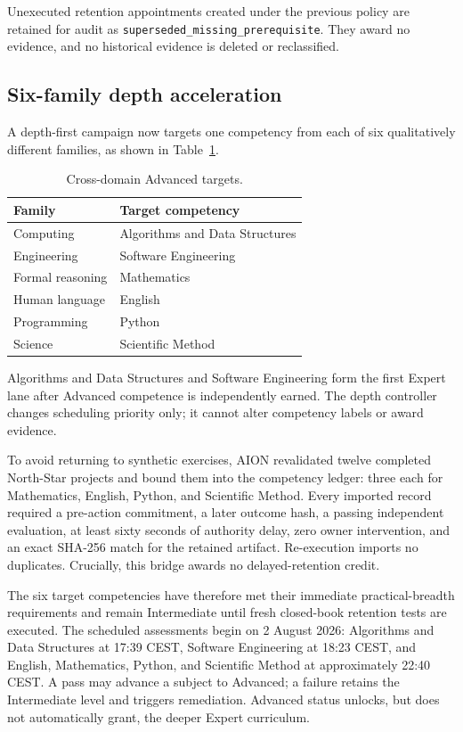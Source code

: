 Unexecuted retention appointments created under the previous policy are retained
for audit as \texttt{superseded\_missing\_prerequisite}.  They award no evidence,
and no historical evidence is deleted or reclassified.

\subsection{Six-family depth acceleration}

A depth-first campaign now targets one competency from each of six qualitatively
different families, as shown in Table~\ref{tab:aion-depth-targets}.

\begin{table}[htbp]
\centering
\caption{Cross-domain Advanced targets.}
\label{tab:aion-depth-targets}
\begin{tabular}{ll}
\hline
\textbf{Family} & \textbf{Target competency} \\
\hline
Computing & Algorithms and Data Structures \\
Engineering & Software Engineering \\
Formal reasoning & Mathematics \\
Human language & English \\
Programming & Python \\
Science & Scientific Method \\
\hline
\end{tabular}
\end{table}

Algorithms and Data Structures and Software Engineering form the first Expert
lane after Advanced competence is independently earned.  The depth controller
changes scheduling priority only; it cannot alter competency labels or award
evidence.

To avoid returning to synthetic exercises, AION revalidated twelve completed
North-Star projects and bound them into the competency ledger: three each for
Mathematics, English, Python, and Scientific Method.  Every imported record
required a pre-action commitment, a later outcome hash, a passing independent
evaluation, at least sixty seconds of authority delay, zero owner intervention,
and an exact SHA-256 match for the retained artifact.  Re-execution imports no
duplicates.  Crucially, this bridge awards no delayed-retention credit.

The six target competencies have therefore met their immediate practical-breadth
requirements and remain Intermediate until fresh closed-book retention tests are
executed.  The scheduled assessments begin on 2 August 2026: Algorithms and Data
Structures at 17:39 CEST, Software Engineering at 18:23 CEST, and English,
Mathematics, Python, and Scientific Method at approximately 22:40 CEST.  A pass
may advance a subject to Advanced; a failure retains the Intermediate level and
triggers remediation.  Advanced status unlocks, but does not automatically
grant, the deeper Expert curriculum.

